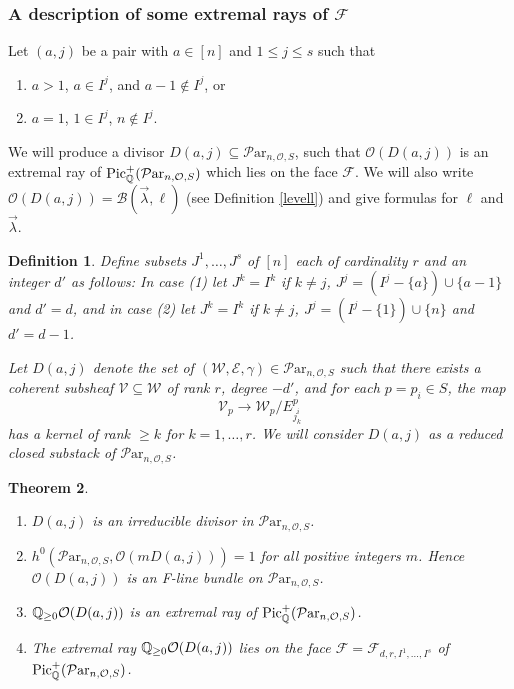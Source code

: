 \documentclass[11pt]{amsart}
\newcommand\mf{\mathcal{F}}
\newcommand\Pic{\operatorname{Pic}}
\newcommand\me{\mathcal{E}}
\newcommand\mv{\mathcal{V}}
\newcommand\mw{\mathcal{W}}
\newcommand\Par{\mathcal{P}\text{ar} }
\newtheorem{theorem}{Theorem}[section]
\newtheorem{defi}[theorem]{Definition}
\numberwithin{theorem}{subsection}
\begin{document}
\subsubsection{A description of some extremal rays of $\mf$}\label{basicR}
Let $(a,j)$ be a pair with $a\in[n]$ and $1\leq j\leq s$ such that
\begin{enumerate}
\item $a>1$, $a\in I^j$, and $a-1\not\in I^j$, or
\item $a=1$, $1\in I^j$, $n\not\in I^j$.
\end{enumerate}
We will produce a divisor $D(a,j)\subseteq \Par_{n,\mathcal{O},S}$, such that $\mathcal{O}(D(a,j))$ is an extremal ray of $\Pic^+_{\Bbb{Q}}(\Par_{n,\mathcal{O},S})$
which lies on the face $\mf$. We will also write $\mathcal{O}(D(a,j))=\mathcal{B}(\vec{\lambda},\ell)$ (see Definition \ref{levell}) and give formulas for $\ell$ and $\vec{\lambda}$.
\begin{defi}
Define subsets $J^1,\dots,J^s$ of $[n]$ each of cardinality $r$ and an integer $d'$ as follows:
In case (1) let $J^k=I^k$ if $k\neq j$, $J^j=(I^j-\{a\}) \cup \{a-1\}$ and $d'=d$, and in case (2) let  $J^k=I^k$ if $k\neq j$, $J^j=(I^j-\{1\}) \cup \{n\}$ and $d'=d-1$.

Let $D(a,j)$ denote the set  of $(\mw,\me,\gamma)\in \Par_{n,\mathcal{O},S}$ such that there exists a
coherent subsheaf $\mv\subseteq \mw$ of  rank $r$,  degree $-d'$, and for each $p=p_i\in S$, the map
 $$\mv_p\to \mw_p/E^p_{j^i_k}$$ has a kernel of rank $\geq k$ for $k=1,\dots,r$. We will consider $D(a,j)$ as a reduced closed substack of $\Par_{n,\mathcal{O},S}$.
\end{defi}
\begin{theorem}\label{Adagio}
\hspace{2em}
\begin{enumerate}
\item  $D(a,j)$ is an irreducible divisor in  $\Par_{n,\mathcal{O},S}$.
\item $h^0(\Par_{n,\mathcal{O},S}, \mathcal{O}(mD(a,j)))=1$ for all positive integers $m$. Hence  $\mathcal{O}(D(a,j))$ is an F-line bundle on $\Par_{n,\mathcal{O},S}$.
\item $\Bbb{Q}_{\geq 0}\mathcal{O}(D(a,j))$  is an extremal ray of $\Pic^+_{\Bbb{Q}}(\Par_{n,\mathcal{O},S})$.
\item The extremal ray $\Bbb{Q}_{\geq 0}\mathcal{O}(D(a,j))$ lies on the face  $\mf=\mf_{d,r,I^1,\dots,I^s}$ of $\Pic^+_{\Bbb{Q}}(\Par_{n,\mathcal{O},S})$.
\end{enumerate}
\end{theorem}
\end{document}
